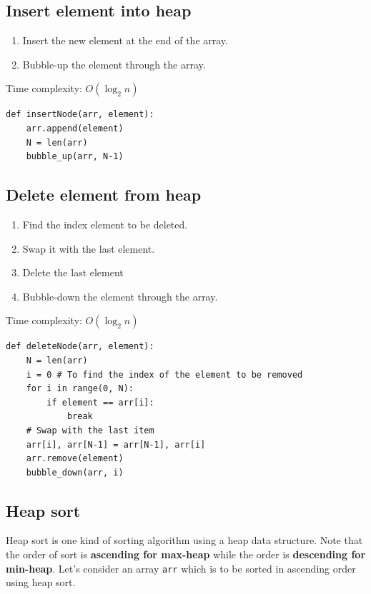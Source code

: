\documentclass[a4paper,11pt]{book}
\begin{document}
\subsection{Insert element into heap}
\begin{enumerate}
    \item Insert the new element at the end of the array.
    \item Bubble-up the element through the array.
\end{enumerate}
\noindent Time complexity: $O(\log_2 n)$
\begin{lstlisting}
def insertNode(arr, element):
    arr.append(element)
    N = len(arr)
    bubble_up(arr, N-1)
\end{lstlisting}

\subsection{Delete element from heap}
\begin{enumerate}
    \item Find the index element to be deleted.
    \item Swap it with the last element.
    \item Delete the last element
    \item Bubble-down the element through the array.
\end{enumerate}
\noindent Time complexity: $O(\log_2 n)$
\begin{lstlisting}
def deleteNode(arr, element):
    N = len(arr)
    i = 0 # To find the index of the element to be removed
    for i in range(0, N):
        if element == arr[i]:
            break
    # Swap with the last item
    arr[i], arr[N-1] = arr[N-1], arr[i]
    arr.remove(element)
    bubble_down(arr, i)
\end{lstlisting}

\subsection{Heap sort}

\noindent Heap sort is one kind of sorting algorithm using a heap data structure. Note that the order of sort is \textbf{ascending for max-heap} while the order is \textbf{descending for min-heap}. Let's consider an array \lstinline{arr} which is to be sorted in ascending order using heap sort.
\end{document}
